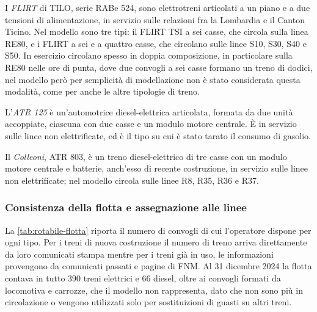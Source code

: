 I \textit{FLIRT} di TILO, serie RABe 524, sono elettrotreni articolati a un piano e a due tensioni di alimentazione, in servizio sulle relazioni fra la Lombardia e il Canton Ticino. Nel modello sono tre tipi: il FLIRT TSI a sei casse, che circola sulla linea RE80, e i FLIRT a sei e a quattro casse, che circolano sulle linee S10, S30, S40 e S50. In esercizio circolano spesso in doppia composizione, in particolare sulla RE80 nelle ore di punta, dove due convogli a sei casse formano un treno di dodici, nel modello però per semplicità di modellazione non è stato considerata questa modalità, come per anche le altre tipologie di treno.

L'\textit{ATR 125} è un'automotrice diesel-elettrica articolata, formata da due unità accoppiate, ciascuna con due casse e un modulo motore centrale. È in servizio sulle linee non elettrificate, ed è il tipo su cui è stato tarato il consumo di gasolio.

Il \textit{Colleoni}, ATR 803, è un treno diesel-elettrico di tre casse con un modulo motore centrale e batterie, anch'esso di recente costruzione, in servizio sulle linee non elettrificate; nel modello circola sulle linee R8, R35, R36 e R37.

\subsubsection{Consistenza della flotta e assegnazione alle linee}
La \cref{tab:rotabile-flotta} riporta il numero di convogli di cui l'operatore dispone per ogni tipo. Per i treni di nuova costruzione il numero di treno arriva direttamente da loro comunicati stampa mentre per i treni già in uso, le informazioni provengono da comunicati passati e pagine di FNM. Al 31 dicembre 2024 la flotta contava in tutto 390 treni elettrici e 66 diesel, oltre ai convogli formati da locomotiva e carrozze, che il modello non rappresenta, dato che non sono più in circolazione o vengono utilizzati solo per sostituizioni di guasti su altri treni.

